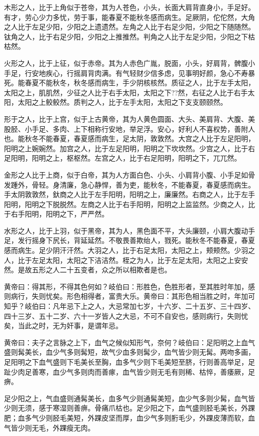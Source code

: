 \documentclass[12pt,UTF8]{ctexbook}
\begin{document}
	木形之人，比于上角似于苍帝，其为人苍色，小头，长面大肩背直身小，手足好。有才，劳心少力多忧，劳于事，能春夏不能秋冬感而病生。足厥阴，佗佗然，大角之人比于左足少阳，少阳之上遗遗然。左角之人比于右足少阳，少阳之下随随然。钛角之人，比于右足少阳，少阳之上推推然。判角之人比于左足少阳，少阳之下枯枯然。
	
	火形之人，比于上征，似于赤帝。其为人赤色广胤，脱面，小头，好肩背，髀腹小手足，行安地疾心，行摇肩背肉满。有气轻财少信多虑，见事明好颜，急心不寿暴死。能春夏不能秋冬，秋冬感而病生，手少阴核核然。质征之人，比于左手太阳，太阳之上，肌肌然，少征之人比于右手太阳，太阳之下??然，右征之人比于右手太阳，太阳之上鲛鲛然。质判之人，比于左手太阳，太阳之下支支颐颐然。
	
	形于之人，比于上宫，似于上古黄帝，其为人黄色圆面、大头、美肩背、大腹、美股胫、小手足、多肉、上下相称行安地，举足浮。安心，好利人不喜权势，善附人也。能秋冬不能春夏，春夏感而病生，足太阴，敦敦然。大宫之人比于左足阳明，阳明之上婉婉然。加宫之人，比于左足阳明，阳明之下坎坎然。少宫之人，比于右足阳明，阳明之上，枢枢然。左宫之人，比于右足阳明，阳明之下，兀兀然。
	
	金形之人比于上商，似于白帝，其为人方面白色、小头、小肩背小腹、小手足如骨发踵外，骨轻。身清廉，急心静悍，善为吏，能秋冬，不能春夏，春夏感而病生。手太阴敦敦然，釱商之人比于左手阳明，阳明之上，廉廉然。右商之人，比于左手阳明，阳明之下脱脱然。左商之人比于右手阳明，阳明之上监监然。少商之人，比于右手阳明，阳明之下，严严然。
	
	水形之人，比于上羽，似于黑帝，其为人，黑色面不平，大头廉颐，小肩大腹动手足，发行摇身下尻长，背延延然。不敬畏善欺绐人，戮死。能秋冬不能春夏，春夏感而病生。足少阴汗汗然。大羽之人，比于右足太阳，太阳之上，颊颊然。少羽之人，比于左足太阳，太阳之下洁洁然。桎之为人，比于左足太阳，太阳之上安安然。是故五形之人二十五变者，众之所以相欺者是也。
	
	黄帝曰：得其形，不得其色何如？岐伯曰：形胜色，色胜形者，至其胜时年加，感则病行，失则忧矣。形色相得者，富贵大乐。黄帝曰：其形色相当胜之时，年加可知乎？岐伯曰：凡年忌下上之人，大忌常加七岁，十六岁、二十五岁、三十四岁、四十三岁、五十二岁、六十一岁皆人之大忌，不可不自安也，感则病行，失则忧矣，当此之时，无为奸事，是谓年忌。
	
	黄帝曰：夫子之言脉之上下，血气之候似知形气，奈何？岐伯曰：足阳明之上血气盛则髯美长，血少气多则髯短，故气少血多则髯少，血气皆少则无髯。两吻多画，足阳明之下血气盛则下毛美长至胸，血多气少则下毛美短至脐，行则善高举足，足趾少肉足善寒，血少气多则肉而善瘃，血气皆少则无毛有则稀、枯悴，善痿厥，足痹。
	
	足少阳之上，气血盛则通髯美长，血多气少则通髯美短，血少气多则少髯，血气皆少则无须，感于寒湿则善痹。骨痛爪枯也。足少阳之下，血气盛则胫毛美长，外踝肥；血多气少则胫毛美短，外踝皮坚而厚，血少气多则胻毛少，外踝皮薄而软，血气皆少则无毛，外踝瘦无肉。
	
\end{document}
